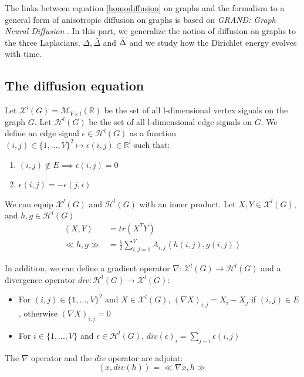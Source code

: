 \documentclass[12pt]{article}
\begin{document}
The links between equation \ref{homodiffusion} on graphs and the formalism to a general form of anisotropic diffusion on graphs is based on \textit{GRAND: Graph Neural Diffusion} . In this part, we generalize the notion of diffusion on graphs to the three Laplacians, $\Delta, \bar{\Delta}$ and $\Tilde{\Delta}$ and we study how the Dirichlet energy evolves with time.

\subsection{The diffusion equation}

Let $\mathcal{X}^l(G) = \mathcal{M}_{V \times l}(\mathbb{R})$ be the set of all l-dimensional vertex signals on the graph $G$. Let $\mathcal{H}^l(G)$ be the set of all l-dimensional edge signals on $G$. We define an edge signal $\epsilon \in \mathcal{H}^l(G)$ as a function $(i,j) \in \{1,...,V\}^2 \mapsto \epsilon(i,j) \in \mathbb{R}^l$ such that:

\begin{enumerate}
    \item $(i,j) \not\in E \implies \epsilon(i,j) = 0$
    \item $\epsilon(i,j) = - \epsilon(j,i)$
\end{enumerate}

\noindent We can equip $\mathcal{X}^l(G)$ and $\mathcal{H}^l(G)$ with an inner product. Let $X,Y \in \mathcal{X}^l(G)$, and $h,g \in \mathcal{H}^l(G)$
\begin{align*}
    \left<X,Y\right> &= tr(X^T Y) \\
    \ll h,g \gg &= \frac{1}{2} \sum_{i,j = 1}^V A_{i,j} \left<h(i,j),g(i,j)\right>
\end{align*}

\noindent In addition, we can define a gradient operator $\nabla: \mathcal{X}^l(G) \longrightarrow \mathcal{H}^l(G)$ and a divergence operator $div: \mathcal{H}^l(G) \longrightarrow \mathcal{X}^l(G)$:
\begin{itemize}
    \item For $(i,j) \in \{1,...,V\}^2$ and $X \in \mathcal{X}^l(G)$, $(\nabla X)_{i,j} = X_i - X_j$ if $(i,j) \in E$, otherwise $(\nabla X)_{i,j} = 0$
    \item For $i \in \{1,...,V\}$ and $\epsilon \in \mathcal{H}^l(G)$, $div(\epsilon)_i = \sum_{j \sim i} \epsilon(i,j)$
\end{itemize}

\begin{thm}
    The $\nabla$ operator and the $div$ operator are adjoint:
    $$
    \left<x,div(h)\right> = \ll \nabla x , h \gg
    $$
\end{thm}
\end{document}
